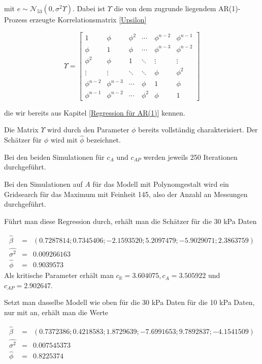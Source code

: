 \documentclass[12pt,a4paper]{article}
\theoremstyle{definition}
\theoremstyle{definition}
\theoremstyle{definition}
\theoremstyle{definition}
\begin{document}
mit $e \sim \mathscr{N}_{53}(0, \sigma^2 \Upsilon)$. Dabei ist $\Upsilon$ die von dem zugrunde liegendem AR(1)-Prozess erzeugte Korrelationsmatrix \eqref{Upsilon}

\begin{equation*}
\Upsilon = 
\left[
   \begin{array}{cccccc}
     1 				& \phi 			& \phi^2	& \cdots	& \phi^{n-2}	& \phi^{n-1} 	\\
     \phi 			& 1		 		& \phi 		& \cdots	& \phi^{n-3}	& \phi^{n-2} 	\\
     \phi^2 		& \phi 			& 1		 	& \ddots	& \vdots		& \vdots 		\\
     \vdots		 	& \vdots	 	& \ddots	& \ddots	& \phi			& \phi^{2} 	\\
     \phi^{n-2} 	& \phi^{n-3}	& \cdots 	& \phi		& 1				& \phi 		\\
     \phi^{n-1} 	& \phi^{n-2} 	& \cdots	& \phi^{2}	& \phi			& 1  
   \end{array}
\right]
\end{equation*}

die wir bereits aus Kapitel \ref{Regression für AR(1)} kennen. 

Die Matrix $\Upsilon$ wird durch den Parameter $\phi$ bereits vollständig charakterisiert. Der Schätzer für $\phi$ wird mit $\hat{\phi}$ bezeichnet.

Bei den beiden Simulationen für $c_{A}$ und $c_{AP}$ werden jeweils 250 Iterationen durchgeführt.

Bei den Simulationen auf $A$ für das Modell mit Polynomgestalt wird ein Gridsearch für das Maximum mit Feinheit 145, also der Anzahl an Messungen durchgeführt.

Führt man diese Regression durch, erhält man die Schätzer für die 30 kPa Daten 

\begin{eqnarray*}
\hat{\beta} &=& (0.7287814 ;  0.7345406 ; -2.1593520 ;  5.2097479 ; -5.9029071 ;  2.3863759) \\
\widehat{\sigma^2} &=& 0.009266163 \\
\hat{\phi} &=& 0.9039573 
\end{eqnarray*}
Als kritische Parameter erhält man $c_{\mathbb{R}} = 3.604075, c_{A} = 3.505922$ und $ c_{AP} = 2.902647 $. 

Setzt man dasselbe Modell wie oben für die 30 kPa Daten für die 10 kPa Daten, nur mit an, erhält man die Werte 

\begin{eqnarray*}
\hat{\beta} &=& (0.7372386;   0.4218583 ;  1.8729639 ; -7.6991653 ;  9.7892837 ; -4.1541509) \\
\widehat{\sigma^2} &=& 0.007545373 \\
\hat{\phi} &=& 0.8225374 
\end{eqnarray*}
\end{document}
